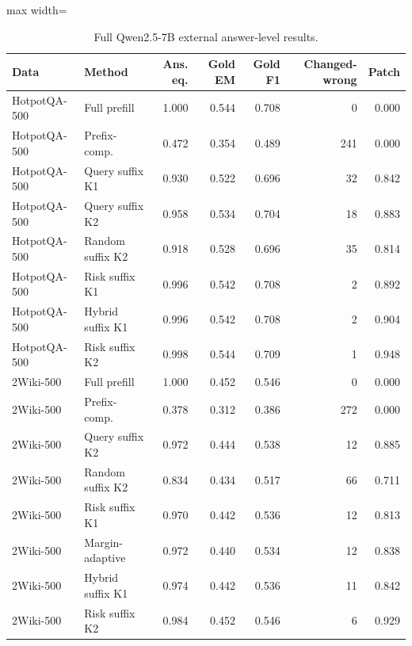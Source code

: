 \begin{table}[t]
\centering
\footnotesize
\begin{adjustbox}{max width=\textwidth}
\begin{tabular}{llrrrrr}
\toprule
Data & Method & Ans. eq. & Gold EM & Gold F1 & Changed-wrong & Patch \\
\midrule
HotpotQA-500 & Full prefill & 1.000 & 0.544 & 0.708 & 0 & 0.000 \\
HotpotQA-500 & Prefix-comp. & 0.472 & 0.354 & 0.489 & 241 & 0.000 \\
HotpotQA-500 & Query suffix K1 & 0.930 & 0.522 & 0.696 & 32 & 0.842 \\
HotpotQA-500 & Query suffix K2 & 0.958 & 0.534 & 0.704 & 18 & 0.883 \\
HotpotQA-500 & Random suffix K2 & 0.918 & 0.528 & 0.696 & 35 & 0.814 \\
HotpotQA-500 & Risk suffix K1 & 0.996 & 0.542 & 0.708 & 2 & 0.892 \\
HotpotQA-500 & Hybrid suffix K1 & 0.996 & 0.542 & 0.708 & 2 & 0.904 \\
HotpotQA-500 & Risk suffix K2 & 0.998 & 0.544 & 0.709 & 1 & 0.948 \\
\midrule
2Wiki-500 & Full prefill & 1.000 & 0.452 & 0.546 & 0 & 0.000 \\
2Wiki-500 & Prefix-comp. & 0.378 & 0.312 & 0.386 & 272 & 0.000 \\
2Wiki-500 & Query suffix K2 & 0.972 & 0.444 & 0.538 & 12 & 0.885 \\
2Wiki-500 & Random suffix K2 & 0.834 & 0.434 & 0.517 & 66 & 0.711 \\
2Wiki-500 & Risk suffix K1 & 0.970 & 0.442 & 0.536 & 12 & 0.813 \\
2Wiki-500 & Margin-adaptive & 0.972 & 0.440 & 0.534 & 12 & 0.838 \\
2Wiki-500 & Hybrid suffix K1 & 0.974 & 0.442 & 0.536 & 11 & 0.842 \\
2Wiki-500 & Risk suffix K2 & 0.984 & 0.452 & 0.546 & 6 & 0.929 \\
\bottomrule
\end{tabular}
\end{adjustbox}
\caption{Full Qwen2.5-7B external answer-level results.}
\label{tab:app-external}
\end{table}
